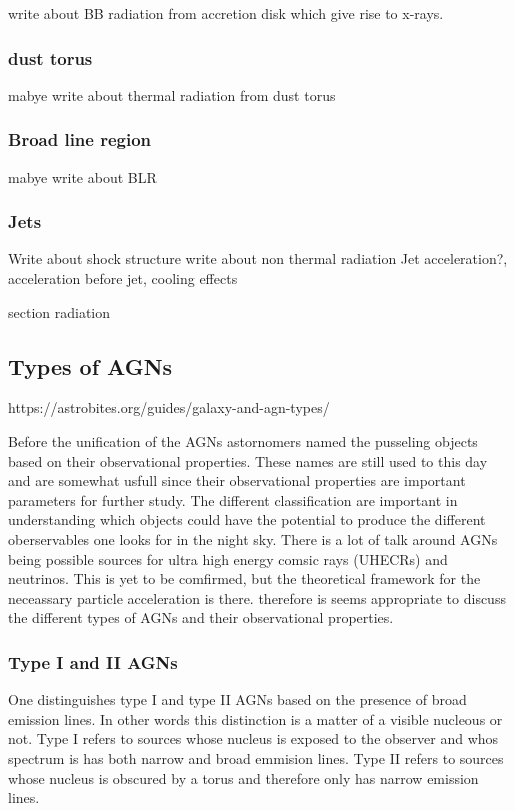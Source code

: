 \documentclass{article}
\begin{document}
write about BB radiation from accretion disk which give rise to x-rays. 

\subsubsection{dust torus}
mabye write about thermal radiation from dust torus

\subsubsection{Broad line region}
mabye write about BLR


\subsubsection{Jets}
Write about shock structure
write about non thermal radiation
Jet acceleration?, acceleration before jet, cooling effects



section radiation




\subsection{Types of AGNs}

https://astrobites.org/guides/galaxy-and-agn-types/

Before the unification of the AGNs astornomers named the pusseling objects based on their observational properties. These 
names are still used to this day and are somewhat usfull since their observational properties are important parameters for further study. 
The different classification are important in understanding which objects could have the potential to produce the different oberservables one 
looks for in the night sky. There is a lot of talk around AGNs being possible sources for ultra high energy comsic rays (UHECRs) and neutrinos.
This is yet to be comfirmed, but the theoretical framework for the neceassary particle acceleration is there. therefore is seems appropriate to
discuss the different types of AGNs and their observational properties.

\subsubsection{Type I and II AGNs}
One distinguishes type I and type II AGNs based on the presence of broad emission lines. In other words this distinction is
a matter of a visible nucleous or not. Type I refers to sources whose nucleus is exposed to the observer and whos spectrum is 
has both narrow and broad emmision lines. Type II refers to sources whose nucleus is obscured by a torus and therefore only has narrow emission lines.
\end{document}
